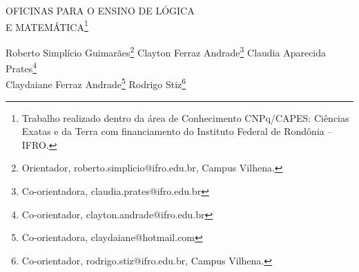 \documentclass[article,12pt,onesidea,4paper,english,brazil]{abntex2}
\begin{document}
	
	
	\frenchspacing 
	
	\begin{center}
		\LARGE OFICINAS PARA O ENSINO DE LÓGICA\\E MATEMÁTICA\footnote{Trabalho realizado dentro da área de Conhecimento CNPq/CAPES: Ciências Exatas e da Terra com financiamento do Instituto Federal de Rondônia – IFRO.}
		
		\normalsize
		Roberto Simplício Guimarães\footnote{Orientador, roberto.simplicio@ifro.edu.br, Campus Vilhena.} 
		Clayton Ferraz Andrade\footnote{Co-orientadora, claudia.prates@ifro.edu.br} 
		Claudia Aparecida Prates\footnote{Co-orientador, clayton.andrade@ifro.edu.br} \\
		Claydaiane Ferraz Andrade\footnote{Co-orientadora, claydaiane@hotmail.com}
		Rodrigo Stiz\footnote{Co-orientador, rodrigo.stiz@ifro.edu.br, Campus Vilhena.} 
	\end{center}
	
\end{document}
